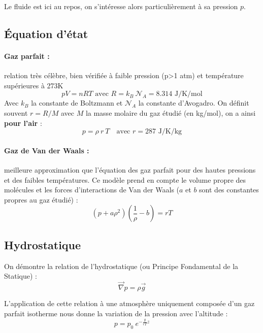 
Le fluide est ici au repos, on s'intéresse alors particulièrement à sa pression $p$.

\subsection{Équation d'état}
\paragraph{Gaz parfait :}relation très célèbre, bien vérifiée à faible pression (p>1 atm) et température supérieures à 273K
%
\begin{equation}
pV = nRT \text{ avec } R = k_B~\mathcal{N}_A = 8.314 \text{ J/K/mol}
\end{equation}
%
Avec $k_B$ la constante de Boltzmann et $\mathcal{N}_A$ la constante d'Avogadro. On définit souvent $r = R/M$ avec $M$ la masse molaire du gaz étudié (en kg/mol), on a ainsi \textbf{pour l'air} :
%
\begin{equation}
p = \rho~r~T \quad\text{avec } r = 287 \text{ J/K/kg}
\end{equation}

\paragraph{Gaz de Van der Waals :}meilleure approximation que l'équation des gaz parfait pour des hautes pressions et des faibles températures. Ce modèle prend en compte le volume propre des molécules et les forces d'interactions de Van der Waals ($a$ et $b$ sont des constantes propres au gaz étudié) :
%
\begin{equation}
\left( p + a\rho^2 \right) \left( \frac{1}{\rho} - b \right) = rT
\end{equation}


\subsection{Hydrostatique}
On démontre la relation de l'hydrostatique (ou Principe Fondamental de la Statique) :
%
\begin{equation}
\vec{\nabla} p = \rho \vec{g}
\label{eq:PFS}
\end{equation}

L'application de cette relation à une atmosphère uniquement composée d'un gaz parfait isotherme nous donne la variation de la pression avec l'altitude :
%
\begin{equation}
p = p_0~e^{-\frac{g}{rT}z}
\end{equation}

